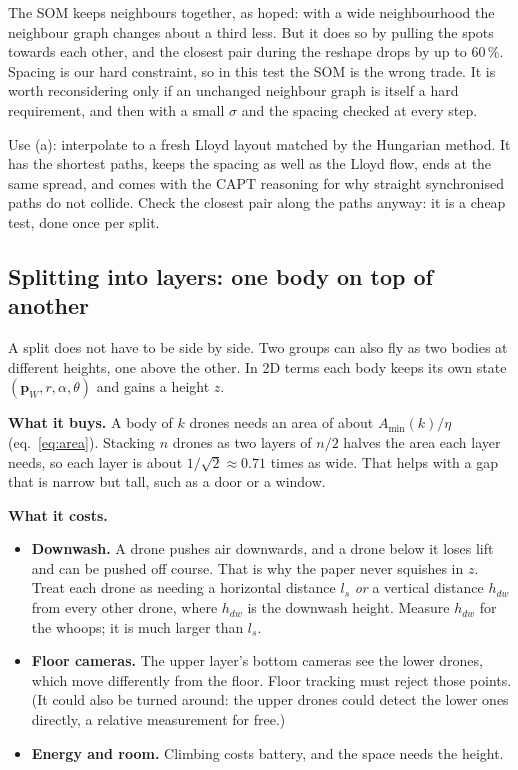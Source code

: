 \documentclass[11pt,a4paper]{article}
\newcommand{\vect}[1]{\mathbf{#1}}
\newcommand{\pW}{\vect{p}_W}
\begin{document}
\begin{watchbox}
The SOM keeps neighbours together, as hoped: with a wide neighbourhood the neighbour graph changes about a third
less. But it does so by pulling the spots towards each other, and the closest pair during the reshape drops by up to
60\,\%. Spacing is our hard constraint, so in this test the SOM is the wrong trade. It is worth reconsidering only if
an unchanged neighbour graph is itself a hard requirement, and then with a small $\sigma$ and the spacing checked at
every step.
\end{watchbox}

\begin{oursbox}
Use (a): interpolate to a fresh Lloyd layout matched by the Hungarian method. It has the shortest paths, keeps the
spacing as well as the Lloyd flow, ends at the same spread, and comes with the CAPT reasoning for why straight
synchronised paths do not collide. Check the closest pair along the paths anyway: it is a cheap test, done once per
split.
\end{oursbox}

\subsection{Splitting into layers: one body on top of another}
A split does not have to be side by side. Two groups can also fly as two bodies at different heights, one above the
other. In 2D terms each body keeps its own state $(\pW,r,\alpha,\theta)$ and gains a height $z$.

\textbf{What it buys.} A body of $k$ drones needs an area of about $A_{\min}(k)/\eta$ (eq.~\ref{eq:area}). Stacking
$n$ drones as two layers of $n/2$ halves the area each layer needs, so each layer is about $1/\sqrt2\approx0.71$ times
as wide. That helps with a gap that is narrow but tall, such as a door or a window.

\textbf{What it costs.}
\begin{itemize}[leftmargin=*]
\item \textbf{Downwash.} A drone pushes air downwards, and a drone below it loses lift and can be pushed off course.
That is why the paper never squishes in $z$. Treat each drone as needing a horizontal distance $l_s$ \emph{or} a
vertical distance $h_{dw}$ from every other drone, where $h_{dw}$ is the downwash height. Measure $h_{dw}$ for the
whoops; it is much larger than $l_s$.
\item \textbf{Floor cameras.} The upper layer's bottom cameras see the lower drones, which move differently from the
floor. Floor tracking must reject those points. (It could also be turned around: the upper drones could detect the
lower ones directly, a relative measurement for free.)
\item \textbf{Energy and room.} Climbing costs battery, and the space needs the height.
\end{itemize}
\end{document}
